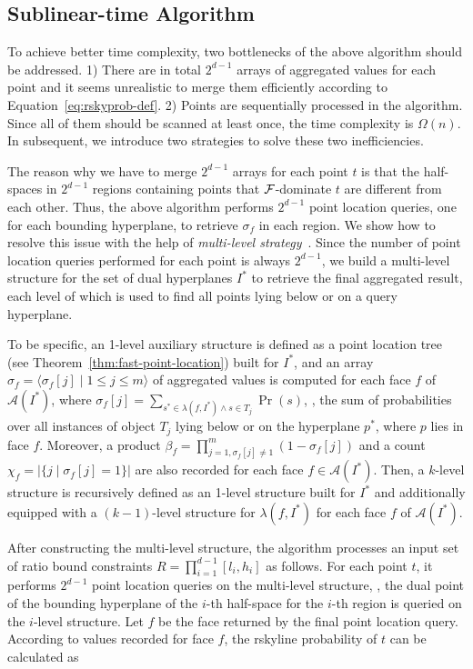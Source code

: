 \subsection{Sublinear-time Algorithm}

To achieve better time complexity, two bottlenecks of the above algorithm should be addressed.
1) There are in total $2^{d-1}$ arrays of aggregated values for each point and it seems unrealistic to merge them efficiently according to Equation~\ref{eq:rskyprob-def}.
2) Points are sequentially processed in the algorithm.
Since all of them should be scanned at least once, the time complexity is $\Omega(n)$.
In subsequent, we introduce two strategies to solve these two inefficiencies.

The reason why we have to merge $2^{d-1}$ arrays for each point $t$ is that the half-spaces in $2^{d-1}$ regions containing points that $\mathcal{F}$-dominate $t$ are different from each other.
Thus, the above algorithm performs $2^{d-1}$ point location queries, one for each bounding hyperplane, to retrieve $\sigma_f$ in each region.
We show how to resolve this issue with the help of \textit{multi-level strategy}~\cite{DBLP:journals/ipl/Bentley79}.
Since the number of point location queries performed for each point is always $2^{d-1}$, we build a multi-level structure for the set of dual hyperplanes $I^*$ to retrieve the final aggregated result, each level of which is used to find all points lying below or on a query hyperplane.

To be specific, an 1-level auxiliary structure is defined as a point location tree (see Theorem~\ref{thm:fast-point-location}) built for $I^*$, and an array $\sigma_f = \langle \sigma_f[j] \mid 1 \le j \le m \rangle$ of aggregated values is computed for each face $f$ of $\mathcal{A}(I^*)$, where $\sigma_f[j] = \sum_{s^* \in \lambda(f, I^*) \wedge s \in T_j}\Pr(s)$, \ie, the sum of probabilities over all instances of object $T_j$ lying below or on the hyperplane $p^*$, where $p$ lies in face $f$.
Moreover, a product $\beta_f = \prod^m_{j = 1, \sigma_f[j] \ne 1}(1 - \sigma_f[j])$ and a count $\chi_f = |\{j \mid \sigma_f[j] = 1\}|$ are also recorded for each face $f \in \mathcal{A}(I^*)$.
Then, a $k$-level structure is recursively defined as an 1-level structure built for $I^*$ and additionally equipped with a $(k - 1)$-level structure for $\lambda(f, I^*)$ for each face $f$ of $\mathcal{A}(I^*)$.

After constructing the multi-level structure, the algorithm processes an input set of ratio bound constraints $R = \prod^{d-1}_{i = 1}[l_i, h_i]$ as follows.
For each point $t$, it performs $2^{d-1}$ point location queries on the multi-level structure, \ie, the dual point of the bounding hyperplane of the $i$-th half-space for the $i$-th region is queried on the $i$-level structure.
Let $f$ be the face returned by the final point location query.
According to values recorded for face $f$, the rskyline probability of $t$ can be calculated as

